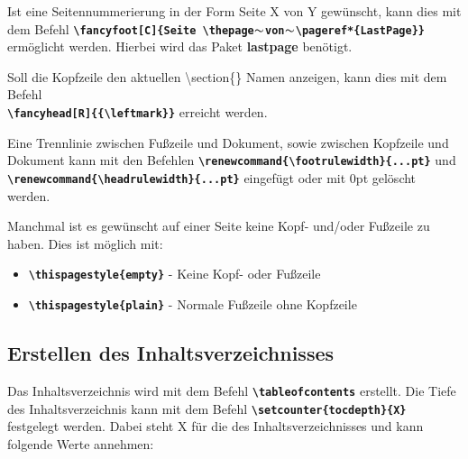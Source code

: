 Ist eine Seitennummerierung in der Form Seite X von Y gewünscht, kann dies mit dem Befehl \textbf{\texttt{\textbackslash fancyfoot[C]\{Seite \textbackslash thepage$\thicksim$von$\thicksim$\textbackslash pageref*\{LastPage\}\}}} ermöglicht werden. Hierbei wird das Paket \textbf{lastpage} benötigt.

Soll die Kopfzeile den aktuellen \textbackslash section\{\} Namen anzeigen, kann dies mit dem Befehl \\ \textbf{\texttt{\textbackslash fancyhead[R]\{\{\textbackslash leftmark\}\}}} erreicht werden.

Eine Trennlinie zwischen Fußzeile und Dokument, sowie zwischen Kopfzeile und Dokument kann mit den Befehlen \textbf{\texttt{\textbackslash renewcommand\{\textbackslash footrulewidth\}\{...pt\}}} und \textbf{\texttt{\textbackslash renewcommand\{\textbackslash headrulewidth\}\{...pt\}}} eingefügt oder mit 0pt gelöscht werden.

Manchmal ist es gewünscht auf einer Seite keine Kopf- und/oder Fußzeile zu haben. Dies ist möglich mit:
\begin{itemize}
  \item \textbf{\texttt{\textbackslash thispagestyle\{empty\}}} - Keine Kopf- oder Fußzeile
  \item \textbf{\texttt{\textbackslash thispagestyle\{plain\}}} - Normale Fußzeile ohne Kopfzeile
\end{itemize}

\newpage

\subsection{Erstellen des Inhaltsverzeichnisses}
\label{sec:inhaltsverzeichnis}
Das Inhaltsverzeichnis wird mit dem Befehl \textbf{\texttt{\textbackslash tableofcontents}} erstellt. Die Tiefe des Inhaltsverzeichnis kann mit dem Befehl \textbf{\texttt{\textbackslash setcounter\{tocdepth\}\{X\}}} festgelegt werden. Dabei steht X für die  des Inhaltsverzeichnisses und kann folgende Werte annehmen:

